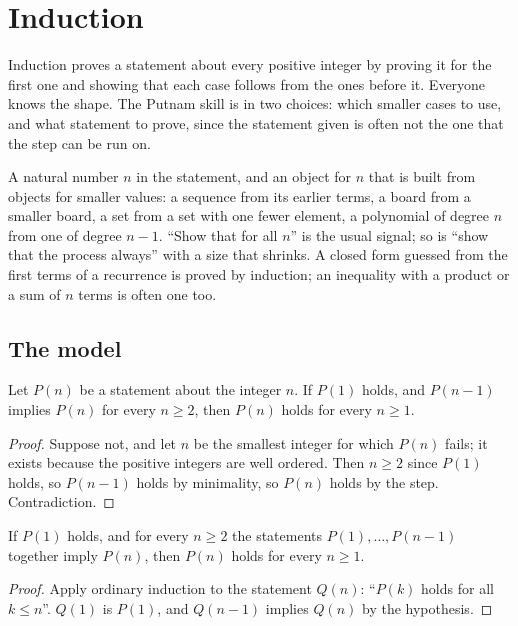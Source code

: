 \section{Induction}
\label{sec:induction}

Induction proves a statement about every positive integer by proving it for the first one and showing that each case follows from the ones before it. Everyone knows the shape. The Putnam skill is in two choices: which smaller cases to use, and what statement to prove, since the statement given is often not the one that the step can be run on.

\begin{recognise}
A natural number $n$ in the statement, and an object for $n$ that is built from objects for smaller values: a sequence from its earlier terms, a board from a smaller board, a set from a set with one fewer element, a polynomial of degree $n$ from one of degree $n-1$. ``Show that for all $n$'' is the usual signal; so is ``show that the process always'' with a size that shrinks. A closed form guessed from the first terms of a recurrence is proved by induction; an inequality with a product or a sum of $n$ terms is often one too.
\end{recognise}

\subsection*{The model}

\begin{theorem}[Induction]
Let $P(n)$ be a statement about the integer $n$. If $P(1)$ holds, and $P(n-1)$ implies $P(n)$ for every $n \ge 2$, then $P(n)$ holds for every $n \ge 1$.
\end{theorem}

\begin{proof}
Suppose not, and let $n$ be the smallest integer for which $P(n)$ fails; it exists because the positive integers are well ordered. Then $n \ge 2$ since $P(1)$ holds, so $P(n-1)$ holds by minimality, so $P(n)$ holds by the step. Contradiction.
\end{proof}

\begin{theorem}
If $P(1)$ holds, and for every $n \ge 2$ the statements $P(1), \dots, P(n-1)$ together imply $P(n)$, then $P(n)$ holds for every $n \ge 1$.
\end{theorem}

\begin{proof}
Apply ordinary induction to the statement $Q(n)$: ``$P(k)$ holds for all $k \le n$''. $Q(1)$ is $P(1)$, and $Q(n-1)$ implies $Q(n)$ by the hypothesis.
\end{proof}


